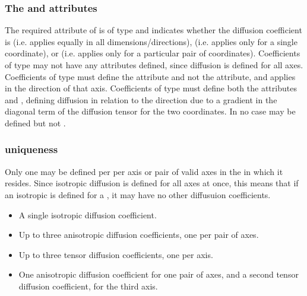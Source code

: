 \subsubsection{The \fixttspace{} and  attributes}
The required  attribute of \DiffusionCoefficient is of type  and indicates whether the diffusion coefficient is  (i.e. applies equally in all dimensions/directions),  (i.e. applies only for a single coordinate), or  (i.e. applies only for a particular pair of coordinates). Coefficients of type  may not have any  attributes defined, since diffusion is defined for all axes.  Coefficients of type  must define the  attribute and not the  attribute, and applies in the direction of that axis.  Coefficients of type  must define both the attributes  and , defining diffusion in relation to the direction due to a gradient in the diagonal term of the diffusion tensor for the two coordinates.  In no case may  be defined but not .

\subsubsection{ uniqueness}
Only one \DiffusionCoefficient may be defined per \Species per axis or pair of valid axes in the \Compartment in which it resides.  Since isotropic diffusion is defined for all axes at once, this means that if an isotropic \DiffusionCoefficient is defined for a \Species, it may have no other diffusuion coefficients.  
\begin{blockChanged}
\begin{itemize}
  \item A single isotropic diffusion coefficient.
  \item Up to three anisotropic diffusion coefficients, one per pair of axes.
  \item Up to three tensor diffusion coefficients, one per axis.
  \item One anisotropic diffusion coefficient for one pair of axes, and a second tensor diffusion coefficient, for the third axis.
\end{itemize}
\end{blockChanged}

